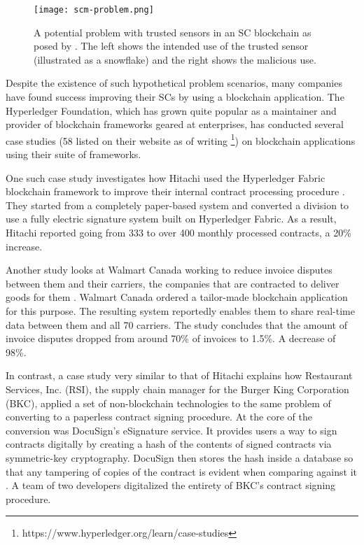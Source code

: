 \begin{figure}
  \texttt{[image: scm-problem.png]}
  \caption{A potential problem with trusted sensors in an SC
  blockchain as posed by \cite{wustBlockchainNeed}. The left shows the
  intended use of the trusted sensor (illustrated as a snowflake) and
  the right
  shows the malicious use.}
  \label{fig:scm-problem}
\end{figure}

Despite the existence of such hypothetical problem scenarios, many
companies have found success improving their SCs by using a blockchain
application. The Hyperledger Foundation, which has grown quite popular
as a maintainer and provider of blockchain frameworks geared at
enterprises, has conducted several case studies (58 listed on their
website as of writing
\footnote{https://www.hyperledger.org/learn/case-studies}) on
blockchain applications using their suite of frameworks.

One such case study investigates how Hitachi used the Hyperledger
Fabric blockchain framework to improve their internal contract
processing procedure \cite{hyperledgerHitachi}. They started from a
completely paper-based system and converted a division to use a fully
electric signature system built on Hyperledger Fabric. As a result,
Hitachi reported going from 333 to over 400 monthly processed
contracts, a 20\% increase.

Another study looks at Walmart Canada working to reduce invoice
disputes between them and their carriers, the companies that are
contracted to deliver goods for them \cite{hyperledgerWalmart}.
Walmart Canada ordered a tailor-made blockchain application for
this purpose. The resulting system reportedly enables them to share
real-time data between them and all 70 carriers. The study concludes
that the amount of invoice disputes dropped from around 70\% of
invoices to 1.5\%. A decrease of 98\%.
 
In contrast, a case study very similar to that of Hitachi
\cite{docusignBurger} explains how Restaurant Services, Inc. (RSI),
the supply chain manager for the Burger King Corporation (BKC),
applied a set of non-blockchain technologies to the same problem of
converting to a paperless contract signing procedure. At the core of
the conversion was DocuSign's eSignature service. It provides users a
way to sign contracts digitally by creating a hash of the contents of
signed contracts via symmetric-key cryptography. DocuSign then stores
the hash inside a database so that any tampering of copies of the
contract is evident when comparing against it \cite{docusignHow}. A
team of two developers digitalized the entirety of BKC's contract
signing procedure.
